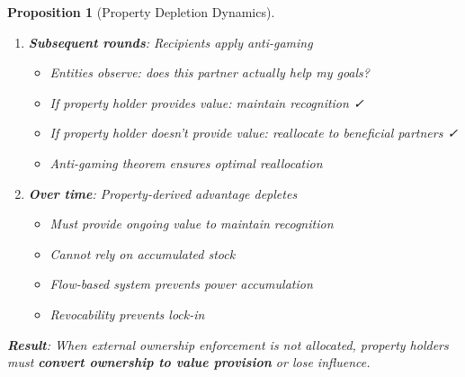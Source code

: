 \documentclass[11pt,a4paper]{article}
\newtheorem{proposition}[theorem]{Proposition}
\theoremstyle{definition}
\theoremstyle{remark}
\begin{document}
\begin{proposition}[Property Depletion Dynamics]
\begin{enumerate}
\item \textbf{Subsequent rounds}: Recipients apply anti-gaming
\begin{itemize}
\item Entities observe: does this partner actually help my goals?
\item If property holder provides value: maintain recognition ✓
\item If property holder doesn't provide value: reallocate to beneficial partners ✓
\item Anti-gaming theorem ensures optimal reallocation
\end{itemize}

\item \textbf{Over time}: Property-derived advantage depletes
\begin{itemize}
\item Must provide ongoing value to maintain recognition
\item Cannot rely on accumulated stock
\item Flow-based system prevents power accumulation
\item Revocability prevents lock-in
\end{itemize}
\end{enumerate}

\textbf{Result}: When external ownership enforcement is not allocated, property holders must \textbf{convert ownership to value provision} or lose influence.
\end{proposition}
\end{document}
